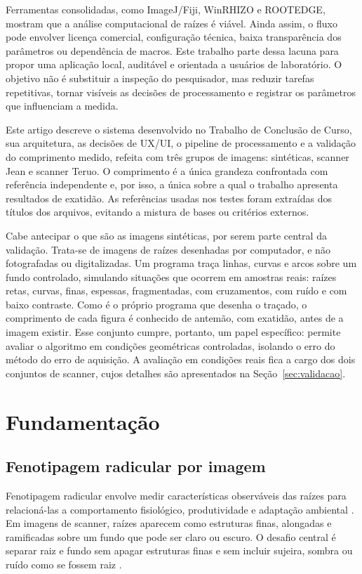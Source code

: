 \documentclass[12pt]{article}
\begin{document}
Ferramentas consolidadas, como ImageJ/Fiji, WinRHIZO e ROOTEDGE, mostram que a análise computacional de raízes é viável. Ainda assim, o fluxo pode envolver licença comercial, configuração técnica, baixa transparência dos parâmetros ou dependência de macros. Este trabalho parte dessa lacuna para propor uma aplicação local, auditável e orientada a usuários de laboratório. O objetivo não é substituir a inspeção do pesquisador, mas reduzir tarefas repetitivas, tornar visíveis as decisões de processamento e registrar os parâmetros que influenciam a medida.

Este artigo descreve o sistema desenvolvido no Trabalho de Conclusão de Curso, sua arquitetura, as decisões de UX/UI, o pipeline de processamento e a validação do comprimento medido, refeita com três grupos de imagens: sintéticas, scanner Jean e scanner Teruo. O comprimento é a única grandeza confrontada com referência independente e, por isso, a única sobre a qual o trabalho apresenta resultados de exatidão. As referências usadas nos testes foram extraídas dos títulos dos arquivos, evitando a mistura de bases ou critérios externos.

Cabe antecipar o que são as imagens sintéticas, por serem parte central da validação. Trata-se de imagens de raízes desenhadas por computador, e não fotografadas ou digitalizadas. Um programa traça linhas, curvas e arcos sobre um fundo controlado, simulando situações que ocorrem em amostras reais: raízes retas, curvas, finas, espessas, fragmentadas, com cruzamentos, com ruído e com baixo contraste. Como é o próprio programa que desenha o traçado, o comprimento de cada figura é conhecido de antemão, com exatidão, antes de a imagem existir. Esse conjunto cumpre, portanto, um papel específico: permite avaliar o algoritmo em condições geométricas controladas, isolando o erro do método do erro de aquisição. A avaliação em condições reais fica a cargo dos dois conjuntos de scanner, cujos detalhes são apresentados na Seção~\ref{sec:validacao}.

\section{Fundamentação}

\subsection{Fenotipagem radicular por imagem}

Fenotipagem radicular envolve medir características observáveis das raízes para relacioná-las a comportamento fisiológico, produtividade e adaptação ambiental \cite{lynch1995root}. Em imagens de scanner, raízes aparecem como estruturas finas, alongadas e ramificadas sobre um fundo que pode ser claro ou escuro. O desafio central é separar raiz e fundo sem apagar estruturas finas e sem incluir sujeira, sombra ou ruído como se fossem raiz \cite{bucksch2014image}.
\end{document}
